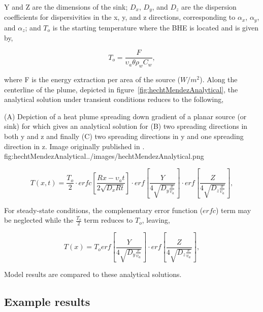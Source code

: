 Y and Z are the dimensions of the sink; $D_x$, $D_y$, and $D_z$ are the dispersion coefficients for dispersivities in the x, y, and z directions, corresponding to $\alpha_x$, $\alpha_y$, and $\alpha_z$; and $T_o$ is the starting temperature where the BHE is located and is given by,

\begin{equation}
	T_o = \frac{F}{\upsilon_a \theta \rho_w C_w},
	\label{eq:hm4}
\end{equation}


where F is the energy extraction per area of the source ($W/m^2$).  Along the centerline of the plume, depicted in figure~\ref{fig:hechtMendezAnalytical}, the analytical solution under transient conditions reduces to the following,

\begin{StandardFigure}{
                                     (A) Depiction of a heat plume spreading down gradient of a planar source (or sink) for which \citep{domenico1985} gives an analytical solution for (B) two spreading directions in both y and z and finally (C) two spreading directions in y and one spreading direction in z.  Image originally published in \cite{hecht2008}.
                                     }{fig:hechtMendezAnalytical}{../images/hechtMendezAnalytical.png}
\end{StandardFigure}

\begin{equation}
	T \left( x, t \right) = \frac{T_o}{2} \cdot erfc \left[ \frac{Rx - \upsilon_a t}{2 \sqrt{D_x R t}} \right] \cdot erf \left[ \frac{ Y }{4 \sqrt{D_y \frac{x}{v_a}}} \right] \cdot  erf \left[ \frac{ Z }{4 \sqrt{D_z \frac{x}{v_a}}} \right],
	\label{eq:hm5}
\end{equation}

For steady-state conditions, the complementary error function ($erfc$) term may be neglected while the $\frac {T_o}{2}$ term reduces to $T_o$, leaving,

\begin{equation}
	T \left( x \right) = T_o erf \left[ \frac{ Y }{4 \sqrt{D_y \frac{x}{v_a}}} \right] \cdot  erf \left[ \frac{ Z }{4 \sqrt{D_z \frac{x}{v_a}}} \right],
	\label{eq:hm6}
\end{equation}

Model results are compared to these analytical solutions.

\subsection{Example results}

